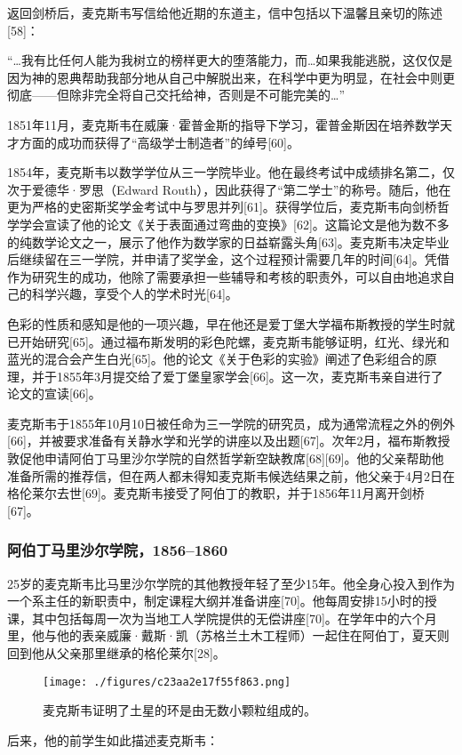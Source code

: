 返回剑桥后，麦克斯韦写信给他近期的东道主，信中包括以下温馨且亲切的陈述[58]：

“…我有比任何人能为我树立的榜样更大的堕落能力，而…如果我能逃脱，这仅仅是因为神的恩典帮助我部分地从自己中解脱出来，在科学中更为明显，在社会中则更彻底——但除非完全将自己交托给神，否则是不可能完美的…”

1851年11月，麦克斯韦在威廉·霍普金斯的指导下学习，霍普金斯因在培养数学天才方面的成功而获得了“高级学士制造者”的绰号[60]。

1854年，麦克斯韦以数学学位从三一学院毕业。他在最终考试中成绩排名第二，仅次于爱德华·罗思（Edward Routh），因此获得了“第二学士”的称号。随后，他在更为严格的史密斯奖学金考试中与罗思并列[61]。获得学位后，麦克斯韦向剑桥哲学学会宣读了他的论文《关于表面通过弯曲的变换》[62]。这篇论文是他为数不多的纯数学论文之一，展示了他作为数学家的日益崭露头角[63]。麦克斯韦决定毕业后继续留在三一学院，并申请了奖学金，这个过程预计需要几年的时间[64]。凭借作为研究生的成功，他除了需要承担一些辅导和考核的职责外，可以自由地追求自己的科学兴趣，享受个人的学术时光[64]。

色彩的性质和感知是他的一项兴趣，早在他还是爱丁堡大学福布斯教授的学生时就已开始研究[65]。通过福布斯发明的彩色陀螺，麦克斯韦能够证明，红光、绿光和蓝光的混合会产生白光[65]。他的论文《关于色彩的实验》阐述了色彩组合的原理，并于1855年3月提交给了爱丁堡皇家学会[66]。这一次，麦克斯韦亲自进行了论文的宣读[66]。

麦克斯韦于1855年10月10日被任命为三一学院的研究员，成为通常流程之外的例外[66]，并被要求准备有关静水学和光学的讲座以及出题[67]。次年2月，福布斯教授敦促他申请阿伯丁马里沙尔学院的自然哲学新空缺教席[68][69]。他的父亲帮助他准备所需的推荐信，但在两人都未得知麦克斯韦候选结果之前，他父亲于4月2日在格伦莱尔去世[69]。麦克斯韦接受了阿伯丁的教职，并于1856年11月离开剑桥[67]。
\subsubsection{阿伯丁马里沙尔学院，1856–1860}
25岁的麦克斯韦比马里沙尔学院的其他教授年轻了至少15年。他全身心投入到作为一个系主任的新职责中，制定课程大纲并准备讲座[70]。他每周安排15小时的授课，其中包括每周一次为当地工人学院提供的无偿讲座[70]。在学年中的六个月里，他与他的表亲威廉·戴斯·凯（苏格兰土木工程师）一起住在阿伯丁，夏天则回到他从父亲那里继承的格伦莱尔[28]。
\begin{figure}[ht]
\centering
\texttt{[image: ./figures/c23aa2e17f55f863.png]}
\caption{麦克斯韦证明了土星的环是由无数小颗粒组成的。} \label{fig_Clerk_3}
\end{figure}
后来，他的前学生如此描述麦克斯韦：


